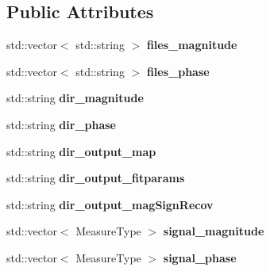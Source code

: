 \subsection*{Public Attributes}
\begin{DoxyCompactItemize}
\item 
std\+::vector$<$ std\+::string $>$ {\bfseries files\+\_\+magnitude}\hypertarget{class_ox_1_1_tomato_options_ae2514e84729bfe5a2b3036a20bb8dc7e}{}\label{class_ox_1_1_tomato_options_ae2514e84729bfe5a2b3036a20bb8dc7e}

\item 
std\+::vector$<$ std\+::string $>$ {\bfseries files\+\_\+phase}\hypertarget{class_ox_1_1_tomato_options_a0a19df83197a729bf632488986448e0d}{}\label{class_ox_1_1_tomato_options_a0a19df83197a729bf632488986448e0d}

\item 
std\+::string {\bfseries dir\+\_\+magnitude}\hypertarget{class_ox_1_1_tomato_options_a1fb48eac36771e52a01a24e5da4911de}{}\label{class_ox_1_1_tomato_options_a1fb48eac36771e52a01a24e5da4911de}

\item 
std\+::string {\bfseries dir\+\_\+phase}\hypertarget{class_ox_1_1_tomato_options_a80111b5325eeed29834f29d0a1b4a057}{}\label{class_ox_1_1_tomato_options_a80111b5325eeed29834f29d0a1b4a057}

\item 
std\+::string {\bfseries dir\+\_\+output\+\_\+map}\hypertarget{class_ox_1_1_tomato_options_afc83b5806f8e353f6fa7277145e803f2}{}\label{class_ox_1_1_tomato_options_afc83b5806f8e353f6fa7277145e803f2}

\item 
std\+::string {\bfseries dir\+\_\+output\+\_\+fitparams}\hypertarget{class_ox_1_1_tomato_options_ab9f082ea4d27a0fb76797f50fef2548f}{}\label{class_ox_1_1_tomato_options_ab9f082ea4d27a0fb76797f50fef2548f}

\item 
std\+::string {\bfseries dir\+\_\+output\+\_\+mag\+Sign\+Recov}\hypertarget{class_ox_1_1_tomato_options_a7b6e008889f06393913818d4fedb1379}{}\label{class_ox_1_1_tomato_options_a7b6e008889f06393913818d4fedb1379}

\item 
std\+::vector$<$ Measure\+Type $>$ {\bfseries signal\+\_\+magnitude}\hypertarget{class_ox_1_1_tomato_options_a1982828a44a1671e3c36e84e9d89d21e}{}\label{class_ox_1_1_tomato_options_a1982828a44a1671e3c36e84e9d89d21e}

\item 
std\+::vector$<$ Measure\+Type $>$ {\bfseries signal\+\_\+phase}\hypertarget{class_ox_1_1_tomato_options_ab6796b153527640b06da685b5a68a950}{}\label{class_ox_1_1_tomato_options_ab6796b153527640b06da685b5a68a950}


\end{DoxyCompactItemize}
